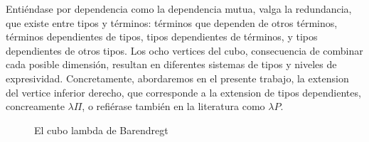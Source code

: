 Entiéndase por dependencia como la dependencia mutua, valga la redundancia, que existe entre tipos y términos: términos que dependen de otros términos, términos dependientes de tipos, tipos dependientes de términos, y tipos dependientes de otros tipos. Los ocho vertices del cubo, consecuencia de combinar cada posible dimensión, resultan en diferentes sistemas de tipos y niveles de expresividad. Concretamente, abordaremos en el presente trabajo, la extension del vertice inferior derecho, que corresponde a la extension de tipos dependientes, concreamente $\lambda\Pi$, o refiérase también en la literatura como $\lambda P$.
\newline
\begin{figure}[htbp]
  \centering
{}
  \caption{El cubo lambda de Barendregt}
  \label{fig:lambda-cube}
\end{figure}

